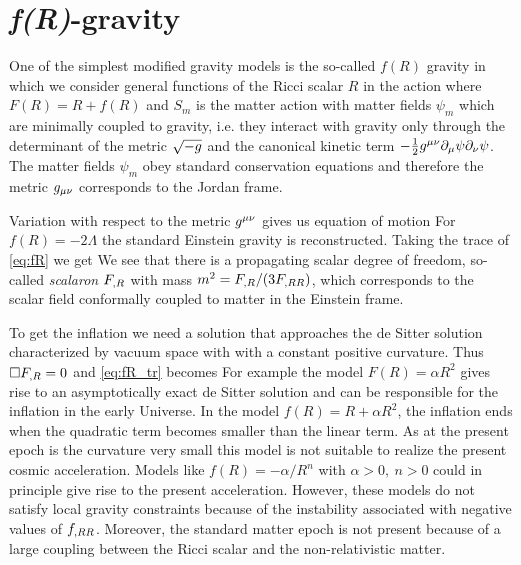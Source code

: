 \section{\textit{f(R)}-gravity}
One of the simplest modified gravity models is the so-called $f(R)$ gravity in which we consider general functions of the Ricci scalar $R$ in the action
where $F(R)=R+f(R)$ and $S_m$ is the matter action with matter fields $\psi_m$ which are minimally coupled to gravity, i.e. they interact with gravity only through the determinant of the metric $\sqrt{-g}$ and the canonical kinetic term $-\frac12g^{\mu\nu}\partial_\mu\psi\partial_\nu\psi$. The matter fields $\psi_m$ obey standard conservation equations and therefore the metric $g_{\mu\nu}$ corresponds to the Jordan frame.

Variation with respect to the metric $g^{\mu\nu}$ gives us equation of motion
For $f(R)=-2\Lambda$ the standard Einstein gravity is reconstructed. Taking the trace of \eqref{eq:fR} we get
We see that there is a propagating scalar degree of freedom, so-called \textit{scalaron} $F_{,R}$ with mass $m^2=F_{,R}/(3F_{,RR})$, which corresponds to the scalar field conformally coupled to matter in the Einstein frame.

To get the inflation we need a solution that approaches the de Sitter solution characterized by vacuum space with with a constant positive curvature. Thus $\Box F_{,R}=0$ and \eqref{eq:fR_tr} becomes
For example the model $F(R)=\alpha R^2$ gives rise to an asymptotically exact de Sitter solution and can be responsible for the inflation in the early Universe. In the model $f(R) = R + \alpha R^2$, the inflation ends when the quadratic term becomes smaller than the linear term. As at the present epoch is the curvature very small this model is not suitable to realize the present cosmic acceleration. Models like $f(R)=-\alpha/R^n$ with $\alpha>0,\ n>0$ could in principle give rise to the present acceleration. However, these models do not satisfy local gravity constraints because of the instability associated with negative values of $f_{,RR}$. Moreover, the standard matter epoch is not present because of a large coupling between the Ricci scalar and the non-relativistic matter.

